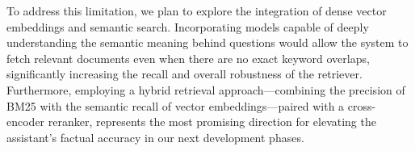 \documentclass[fleqn,moreauthors,10pt]{ds_report}
\begin{document}
To address this limitation, we plan to explore the integration of dense vector embeddings and semantic search.
Incorporating models capable of deeply understanding the semantic meaning behind questions would allow the system to fetch relevant documents even when there
are no exact keyword overlaps, significantly increasing the recall and overall robustness of the retriever.
Furthermore, employing a hybrid retrieval approach---combining the precision of BM25 with the semantic recall of vector embeddings---paired
with a cross-encoder reranker, represents the most promising direction for elevating the assistant's factual accuracy in our next development phases.








\end{document}

